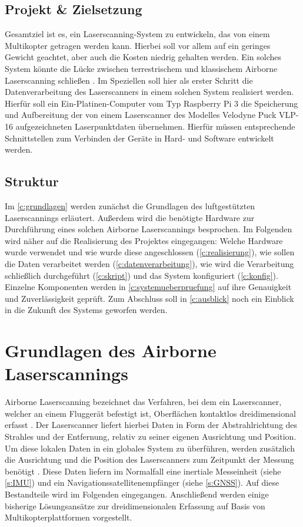 \documentclass[a4paper,12pt,bibliography=totoc, listof=totoc,titlepage,pointlessnumbers]{scrreprt}
\begin{document}
\section{Projekt \& Zielsetzung}
Gesamtziel ist es, ein Laser\-scan\-ning-System zu entwickeln, das von einem Multikopter getragen werden kann. Hierbei soll vor allem auf ein geringes Gewicht geachtet, aber auch die Kosten niedrig gehalten werden. Ein solches System könnte die Lücke zwischen terrestrischem und klassischem Air\-borne Laser\-scan\-ning schließen \citep[S. 21f]{uav}. Im Speziellen soll hier als erster Schritt die Datenverarbeitung des Laser\-scan\-ners in einem solchen System realisiert werden. Hierfür soll ein Ein-Platinen-Computer vom Typ Rasp\-berry Pi 3 die Speicherung und Aufbereitung der von einem Laser\-scan\-ner des Modelles Velodyne Puck VLP-16 aufgezeichneten Laserpunktdaten übernehmen. Hierfür müssen entsprechende Schnittstellen zum Verbinden der Geräte in Hard- und Software entwickelt werden.

\section{Struktur}
Im \autoref{c:grundlagen} werden zunächst die Grundlagen des luftgestützten Laser\-scan\-nings erläutert. Außerdem wird die benötigte Hardware zur Durchführung eines solchen Airborne Laser\-scan\-nings besprochen. Im Folgenden wird näher auf die Realisierung des Projektes eingegangen: Welche Hardware wurde verwendet und wie wurde diese angeschlossen (\autoref{c:realisierung}), wie sollen die Daten verarbeitet werden (\autoref{c:datenverarbeitung}), wie wird die Verarbeitung schließlich durchgeführt (\autoref{c:skript}) und das System konfiguriert (\autoref{c:konfig}). Einzelne Komponenten werden in \autoref{c:systemueberpruefung} auf ihre Genauigkeit und Zuverlässigkeit geprüft. Zum Abschluss soll in \autoref{c:ausblick} noch ein Einblick in die Zukunft des Systems geworfen werden.

\chapter{Grundlagen des Air\-borne Laser\-scan\-nings}
\label{c:grundlagen}

Air\-borne Laser\-scan\-ning bezeichnet das Verfahren, bei dem ein Laser\-scan\-ner, welcher an einem Fluggerät befestigt ist, Oberflächen kontaktlos dreidimensional erfasst \citep[S. 1]{beraldin}. Der Laser\-scan\-ner liefert hierbei Daten in Form der Abstrahlrichtung des Strahles und der Entfernung, relativ zu seiner eigenen Ausrichtung und Position. Um diese lokalen Daten in ein globales System zu überführen, werden zusätzlich die Ausrichtung und die Position des Laser\-scan\-ners zum Zeitpunkt der Messung benötigt \citep[S. 22f]{beraldin}. Diese Daten liefern im Normalfall eine inertiale Messeinheit (siehe \autoref{s:IMU}) und ein Navigationssatellitenempfänger (siehe \autoref{s:GNSS}). Auf diese Bestandteile wird im Folgenden eingegangen. Anschließend werden einige bisherige Lösungsansätze zur dreidimensionalen Erfassung auf Basis von Multikopterplattformen vorgestellt.
\end{document}
